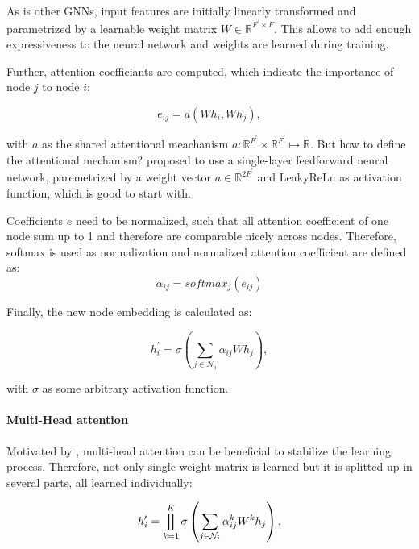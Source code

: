 As is other GNNs, input features are initially 
linearly transformed and parametrized by a learnable weight matrix $W \in \mathbb{R}^{F^{\prime} \times F}$.
This allows to add enough expressiveness to the neural network and weights are learned during training.

Further, attention coefficiants are computed, which indicate the importance of node $j$ to node $i$:

\begin{equation}
  e_{ij} = a(Wh_i, Wh_j),
\end{equation}

with $a$ as the shared attentional meachanism $a : \mathbb{R}^{F^{\prime}} \times \mathbb{R}^{F^{\prime}} \mapsto \mathbb{R}$.
But how to define the attentional mechanism? 
\citet{GAT} proposed to use a single-layer feedforward neural network, paremetrized by a weight vector $a \in \mathbb{R}^{2F^{\prime}}$
and LeakyReLu as activation function, which is good to start with.
 
Coefficients $e$ need to be normalized, such that all attention coefficient of one node sum up to 1 and therefore are comparable nicely across nodes.
Therefore, softmax is used as normalization and normalized attention coefficient are defined as:
\begin{equation}
  \alpha_{ij} = softmax_j(e_{ij})
\end{equation}


Finally, the new node embedding is calculated as:

\begin{equation}
  h_i^{\prime} = \sigma \left( \sum_{j \in \mathcal{N}_i} \alpha_{ij} W h_j \right),
\end{equation}

with $\sigma$ as some arbitrary activation function.

\paragraph{Multi-Head attention}
Motivated by \citet{transformer}, multi-head attention can be beneficial to stabilize the learning process.
Therefore, not only single weight matrix is learned but it is splitted up in several parts, 
all learned individually:

\begin{equation}
  h_i^{\prime} = \bigparallel^K_{k=1} \sigma \left(\sum_{j \in \mathcal{N}_i} \alpha_{ij}^k W^k h_j \right),  
\end{equation}

